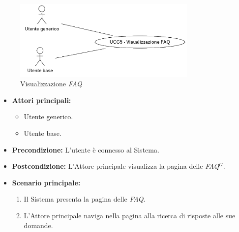 \newpage
{}

\label{usecase:Visualizzazione FAQ}

\begin{figure}[h]
	\centering
	\includegraphics[width=0.8\textwidth]{./uml/UCG5.png} 
	\caption{Visualizzazione \textit{FAQ}}
	\label{fig:UCG5}
  \end{figure}

\begin{itemize}
	\item \textbf{Attori principali:} 
	\begin{itemize}
		\item Utente generico.
		\item Utente base.
	\end{itemize}


	\item \textbf{Precondizione:}
	      L'utente è connesso al Sistema.

	\item \textbf{Postcondizione:} L'Attore principale visualizza la pagina delle \textit{\ac{FAQ}$^G$}.

	\item \textbf{Scenario principale:}
	      \begin{enumerate}
              \item Il Sistema presenta la pagina delle \textit{\ac{FAQ}}.
              \item L'Attore principale naviga nella pagina alla ricerca di risposte alle sue domande.
		    
	      \end{enumerate}
\end{itemize}